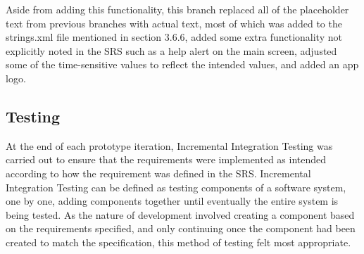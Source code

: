 \documentclass[12pt]{article}
\begin{document}
Aside from adding this functionality, this branch replaced all of the placeholder text from previous branches with actual text, most of which was added to the strings.xml file mentioned in
section 3.6.6, added some extra functionality not explicitly noted in the SRS such as a help alert on the main screen, adjusted some of the time-sensitive values to reflect the intended
values, and added an app logo.

\newpage

\subsection{Testing}
At the end of each prototype iteration, Incremental Integration Testing was carried out to ensure that the requirements were implemented as intended according to how the requirement was
defined in the SRS. Incremental Integration Testing can be defined as testing components of a software system, one by one, adding components together until eventually the entire system
is being tested. As the nature of development involved creating a component based on the requirements specified, and only continuing once the component had been created to match the specification, 
this method of testing felt most appropriate.
\end{document}
